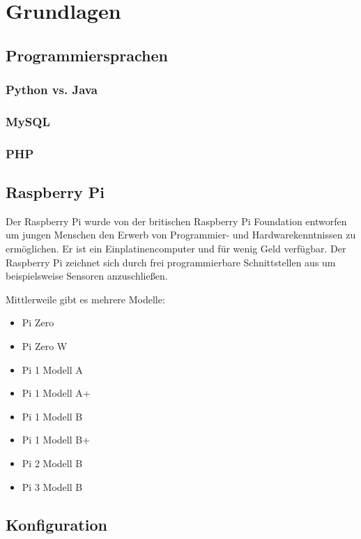 \chapter{Grundlagen}

\section{Programmiersprachen}

\subsection{Python vs. Java}

\subsection{MySQL}

\subsection{PHP}

\section{Raspberry Pi}
Der Raspberry Pi wurde von der britischen Raspberry Pi Foundation entworfen um
jungen Menschen den Erwerb von Programmier- und Hardwarekenntnissen zu
ermöglichen. Er ist ein Einplatinencomputer und für wenig Geld verfügbar. Der
Raspberry Pi zeichnet sich durch frei programmierbare Schnittstellen aus um
beispielsweise Sensoren anzuschließen.

 Mittlerweile gibt es mehrere Modelle:

\begin{itemize} 
\item Pi Zero 
\item Pi Zero W
\item Pi 1 Modell A
\item Pi 1 Modell A+
\item Pi 1 Modell B
\item Pi 1 Modell B+
\item Pi 2 Modell B
\item Pi 3 Modell B 
\end{itemize}


\section{Konfiguration}

